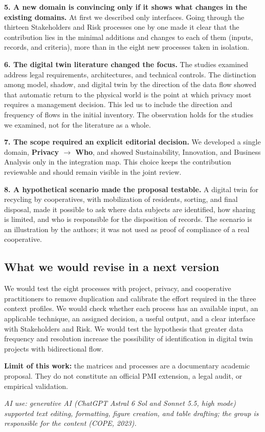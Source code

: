 \documentclass[12pt,a4paper,article,oneside,brazil,english]{abntex2}
\begin{document}
\textbf{5. A new domain is convincing only if it shows what changes in the existing domains.} At first we described only interfaces. Going through the thirteen Stakeholders and Risk processes one by one made it clear that the contribution lies in the minimal additions and changes to each of them (inputs, records, and criteria), more than in the eight new processes taken in isolation.

\textbf{6. The digital twin literature changed the focus.} The studies examined address legal requirements, architectures, and technical controls. The distinction among model, shadow, and digital twin by the direction of the data flow showed that automatic return to the physical world is the point at which privacy most requires a management decision. This led us to include the direction and frequency of flows in the initial inventory. The observation holds for the studies we examined, not for the literature as a whole.

\textbf{7. The scope required an explicit editorial decision.} We developed a single domain, \textbf{Privacy \ensuremath{\rightarrow} Who}, and showed Sustainability, Innovation, and Business Analysis only in the integration map. This choice keeps the contribution reviewable and should remain visible in the joint review.

\textbf{8. A hypothetical scenario made the proposal testable.} A digital twin for recycling by cooperatives, with mobilization of residents, sorting, and final disposal, made it possible to ask where data subjects are identified, how sharing is limited, and who is responsible for the disposition of records. The scenario is an illustration by the authors; it was not used as proof of compliance of a real cooperative.

\subsection*{What we would revise in a next version}

We would test the eight processes with project, privacy, and cooperative practitioners to remove duplication and calibrate the effort required in the three context profiles. We would check whether each process has an available input, an applicable technique, an assigned decision, a useful output, and a clear interface with Stakeholders and Risk. We would test the hypothesis that greater data frequency and resolution increase the possibility of identification in digital twin projects with bidirectional flow.

\textbf{Limit of this work:} the matrices and processes are a documentary academic proposal. They do not constitute an official PMI extension, a legal audit, or empirical validation.

\vspace{\onelineskip}
{\footnotesize\SingleSpacing\noindent\textit{AI use: generative AI (ChatGPT Astral 6 Sol and Sonnet 5.5, high mode) supported text editing, formatting, figure creation, and table drafting; the group is responsible for the content (COPE, 2023).}\par}
\end{document}
